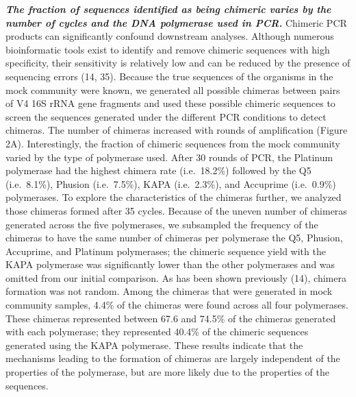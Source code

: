\documentclass[11pt,]{article}
\begin{document}
\textbf{\emph{The fraction of sequences identified as being chimeric
varies by the number of cycles and the DNA polymerase used in PCR.}}
Chimeric PCR products can significantly confound downstream analyses.
Although numerous bioinformatic tools exist to identify and remove
chimeric sequences with high specificity, their sensitivity is
relatively low and can be reduced by the presence of sequencing errors
(14, 35). Because the true sequences of the organisms in the mock
community were known, we generated all possible chimeras between pairs
of V4 16S rRNA gene fragments and used these possible chimeric sequences
to screen the sequences generated under the different PCR conditions to
detect chimeras. The number of chimeras increased with rounds of
amplification (Figure 2A). Interestingly, the fraction of chimeric
sequences from the mock community varied by the type of polymerase used.
After 30 rounds of PCR, the Platinum polymerase had the highest chimera
rate (i.e.~18.2\%) followed by the Q5 (i.e.~8.1\%), Phusion
(i.e.~7.5\%), KAPA (i.e.~2.3\%), and Accuprime (i.e.~0.9\%) polymerases.
To explore the characteristics of the chimeras further, we analyzed
those chimeras formed after 35 cycles. Because of the uneven number of
chimeras generated across the five polymerases, we subsampled the
frequency of the chimeras to have the same number of chimeras per
polymerase the Q5, Phusion, Accuprime, and Platinum polymerases; the
chimeric sequence yield with the KAPA polymerase was significantly lower
than the other polymerases and was omitted from our initial comparison.
As has been shown previously (14), chimera formation was not random.
Among the chimeras that were generated in mock community samples, 4.4\%
of the chimeras were found across all four polymerases. These chimeras
represented between 67.6 and 74.5\% of the chimeras generated with each
polymerase; they represented 40.4\% of the chimeric sequences generated
using the KAPA polymerase. These results indicate that the mechanisms
leading to the formation of chimeras are largely independent of the
properties of the polymerase, but are more likely due to the properties
of the sequences.
\end{document}
